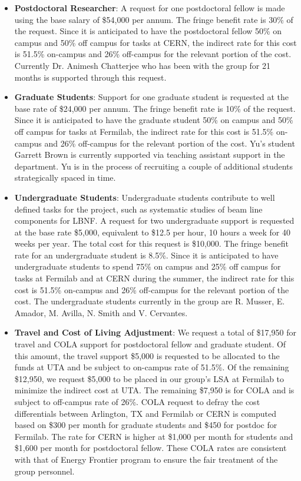 \begin{enumerate}
\begin{itemize}[noitemsep,nolistsep]
\item {{\bf Postdoctoral Researcher}: A request for one postdoctoral fellow is made using the base salary of \$54,000 per annum.  The fringe benefit rate is 30\% of the request.  Since it is anticipated to have the postdoctoral fellow 50\% on campus and 50\% off campus for tasks at CERN, the indirect rate for this cost is 51.5\% on-campus and 26\% off-campus for the relevant portion of the cost.  Currently Dr. Animesh Chatterjee who has been with the group for 21 months is supported through this request.} 

\item{{\bf Graduate Students}: Support for one graduate student is requested at the base rate of \$24,000 per annum.   The fringe benefit rate is 10\% of the request.  Since it is anticipated to have the graduate student 50\% on campus and 50\% off campus for tasks at Fermilab, the indirect rate for this cost is 51.5\% on-campus and 26\% off-campus for the relevant portion of the cost.   Yu’s student Garrett Brown is currently supported via teaching assistant support in the department.   Yu is in the process of recruiting a couple of additional students strategically spaced in time. }

\item {{\bf Undergraduate Students}: Undergraduate students contribute to well defined tasks for the project, such as systematic studies of beam line components for LBNF.  A request for two undergraduate support is requested at the base rate \$5,000, equivalent to \$12.5 per hour, 10 hours a week for 40 weeks per year.  The total cost for this request is \$10,000.  The fringe benefit rate for an undergraduate student is 8.5\%.  Since it is anticipated to have undergraduate students to spend 75\% on campus and 25\% off campus for tasks at Fermilab and at CERN during the summer, the indirect rate for this cost is 51.5\% on-campus and 26\% off-campus for the relevant portion of the cost.   The undergraduate students currently in the group are R. Musser,  E. Amador, M. Avilla, N. Smith and V. Cervantes.}

\item{{\bf Travel and Cost of Living Adjustment}: We request a total of \$17,950 for travel and COLA support for postdoctoral fellow and graduate student.   Of this amount, the travel support \$5,000 is requested to be allocated to the funds at UTA and be subject to on-campus rate of 51.5\%.  Of the remaining \$12,950, we request \$5,000 to be placed in our group’s LSA at Fermilab to minimize the indirect cost at UTA.   The remaining \$7,950 is for COLA and is subject to off-campus rate of 26\%.  COLA request to defray the cost differentials between Arlington, TX and Fermilab or CERN is computed based on \$300 per month for graduate students and \$450 for postdoc for Fermilab.  The rate for CERN is higher at \$1,000 per month for students and \$1,600 per month for postdoctoral fellow.  These COLA rates are consistent with that of Energy Frontier program to ensure the fair treatment of the group personnel.}


\end{itemize}
\end{enumerate}
